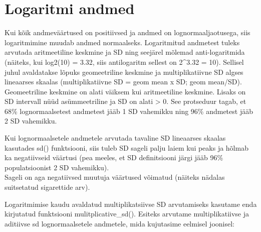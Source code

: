 \documentclass[]{book}
\begin{document}
\section*{Logaritmi andmed}\label{logaritmi-andmed}

Kui kõik andmeväärtused on positiivsed ja andmed on lognormaaljaotusega,
siis logaritmimine muudab andmed normaalseks. Logaritmitud andmetest
tuleks arvutada aritmeetiline keskmine ja SD ning seejärel mõlemad
anti-logaritmida (näiteks, kui log2(10) = 3.32, siis antilogaritm
sellest on 2\^{}3.32 = 10). Sellisel juhul avaldatakse lõpuks
geomeetriline keskmine ja multiplikatiivne SD algses lineaarses skaalas
(multiplikatiivne SD = geom mean x SD; geom mean/SD). Geomeetriline
keskmine on alati väiksem kui aritmeetiline keskmine. Lisaks on SD
intervall nüüd asümmeetriline ja SD on alati \textgreater{} 0. See
protseduur tagab, et 68\% lognormaalsetest andmetest jääb 1 SD vahemikku
ning 96\% andmetest jääb 2 SD vahemikku.

Kui lognormaalsetele andmetele arvutada tavaline SD lineaarses skaalas
kasutades sd() funktsiooni, siis tuleb SD sageli palju laiem kui peaks
ja hõlmab ka negatiivseid väärtusi (pea meeles, et SD definitsiooni
järgi jääb 96\% populatsioonist 2 SD vahemikku).\\
Sageli on aga negatiivsed muutuja väärtused võimatud (näiteks nädalas
suitsetatud sigarettide arv).

Logaritmimise kaudu avaldatud multiplikatsiivse SD arvutamiseks kasutame
enda kirjutatud funktsiooni mulitplicative\_sd(). Esiteks arvutame
multiplikatiivse ja aditiivse sd lognormaalsetele andmetele, mida
kujutasime eelmisel joonisel:
\end{document}
